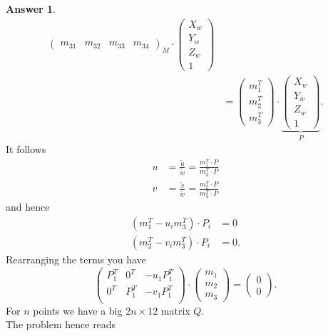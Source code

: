 \documentclass[a4paper,12 pt]{article}
\theoremstyle{definition}
\theoremstyle{remark}
\theoremstyle{definition}
\theoremstyle{definition}
\theoremstyle{definition}
\theoremstyle{definition}
\theoremstyle{remark}
\theoremstyle{remark}
\theoremstyle{definition}
\theoremstyle{definition}
\newtheorem*{answer}{Answer}
\begin{document}
\begin{enumerate}
\begin{enumerate}
\begin{answer}
\begin{equation}
\begin{split}
{\begin{pmatrix}
 m_{31}&m_{32}&m_{33}&m_{34}
 \end{pmatrix}}_{M}\cdot \begin{pmatrix}
 X_w\\
 Y_w\\
 Z_w\\
 1
 \end{pmatrix}\\
 &=\begin{pmatrix}
m_1^T\\
m_2^T\\
m_3^T
\end{pmatrix}\cdot \underbrace{\begin{pmatrix}
 X_w\\
 Y_w\\
 Z_w\\
 1
 \end{pmatrix}}_{P}.
 \end{split}
\end{equation}
It follows
\begin{equation}
\begin{split}
u&=\frac{\tilde{u}}{\tilde{w}}=\frac{m_1^T\cdot P}{m_3^T\cdot P}\\
v&=\frac{\tilde{v}}{\tilde{w}}=\frac{m_2^T\cdot P}{m_3^T\cdot P}
\end{split}
\end{equation}
and hence
\begin{equation}
\begin{split}
(m_1^T-u_im_3^T)\cdot P_i&=0\\
(m_2^T-v_im_3^T)\cdot P_i&=0.
\end{split}
\end{equation}
Rearranging the terms you have
\begin{equation}
\begin{pmatrix}
P_1^T &0^T&-u_1P_1^T\\
0^T&P_1^T&-v_1P_1^T\\
\end{pmatrix}\cdot \begin{pmatrix}
 m_1\\
 m_2\\
 m_3
 \end{pmatrix}=\begin{pmatrix}
0\\
0
\end{pmatrix}.
\end{equation}
For $n$ points we have a big $2n \times 12$ matrix $Q$.\\ The problem hence reads
\begin{equation}

\end{equation}
\end{answer}
\end{enumerate}
\end{enumerate}
\end{document}
